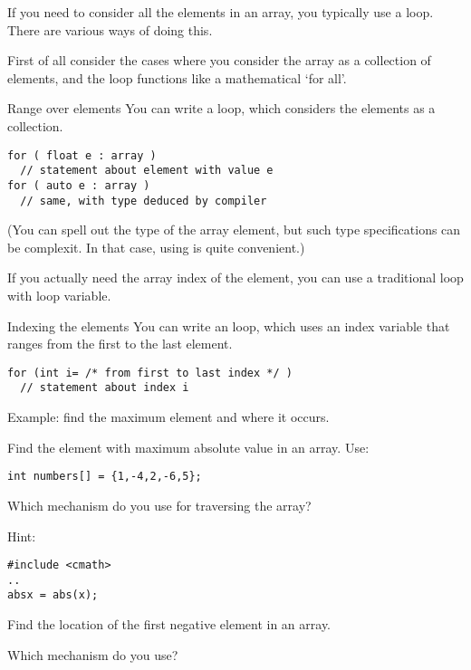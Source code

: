 If you need to consider all the elements in an array, you typically
use a  loop. There are various ways of doing this.

First of all consider the cases where you consider the array as a
collection of elements, and the loop functions like a mathematical
`for all'.

\begin{block}{Range over elements}
  \label{sl:array-range}
  You can write a  loop, which
  considers the elements as a collection.
\begin{verbatim}
for ( float e : array )
  // statement about element with value e
for ( auto e : array )
  // same, with type deduced by compiler
\end{verbatim}

\end{block}

(You can spell out the type of the array element, but such type
specifications can be complexit. In that case, using  is
quite convenient.)

If you actually need the array index of the element, you can use a
traditional  loop with loop variable.

\begin{block}{Indexing the elements}
  \label{sl:index-range}
  You can write an  loop, which uses an
  index variable that ranges from the first to the last element.
\begin{verbatim}
for (int i= /* from first to last index */ )
  // statement about index i
\end{verbatim}
Example: find the maximum element and where it occurs.
%
\end{block}

\begin{exercise}
  \label{ex:array-max}
  Find the element with maximum absolute value in an array. Use:
\begin{verbatim}
int numbers[] = {1,-4,2,-6,5};
\end{verbatim}
Which mechanism do you use for traversing the array?

Hint:
\begin{verbatim}
#include <cmath>
..
absx = abs(x);
\end{verbatim}
\end{exercise}

\begin{exercise}
  \label{ex:array-maxidx}
  Find the location of the first negative element in an array.

  Which mechanism do you use?
\end{exercise}

